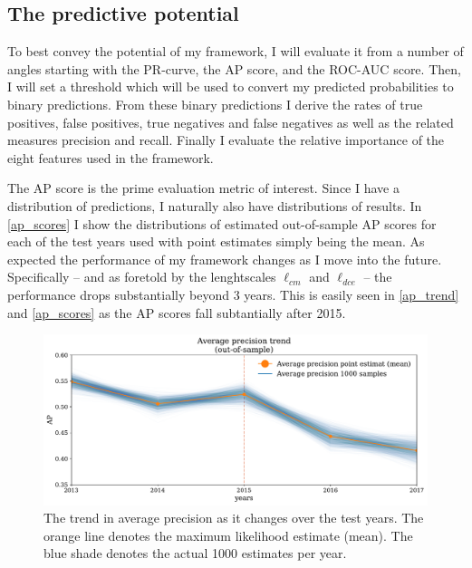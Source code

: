 \documentclass[a4paper]{article}
\begin{document}
\subsection{The predictive potential}

To best convey the potential of my framework, I will evaluate it from a number of angles starting with the PR-curve, the AP score, and the ROC-AUC score. Then, I will set a threshold which will be used to convert my predicted probabilities to binary predictions. From these binary predictions I derive the rates of true positives, false positives, true negatives and false negatives as well as the related measures precision and recall. Finally I evaluate the relative importance of the eight features used in the framework.\par

The AP score is the prime evaluation metric of interest. Since I have a distribution of predictions, I naturally also have distributions of results. In \autoref{ap_scores} I show the distributions of estimated out-of-sample AP scores for each of the test years used with point estimates simply being the mean. As expected the performance of my framework changes as I move into the future. Specifically -- and as foretold by the lenghtscales $\ell_{cm}$ and $\ell_{dce}$ -- the performance drops substantially beyond 3 years. This is easily seen in \autoref{ap_trend} and \autoref{ap_scores} as the AP scores fall subtantially after 2015.\par

\begin{figure}[!htb]
	\centering
	\includegraphics[scale=0.47]{ap_trend_alt.pdf}
    \caption{\footnotesize{The trend in average precision as it changes over the test years. The orange line denotes the maximum likelihood estimate (mean). The blue shade denotes the actual 1000 estimates per year.}}\label{ap_trend}
\end{figure}
\end{document}
